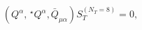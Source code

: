 \begin{equation*}
( Q^\alpha, \,^\star Q^\alpha, \bar{Q}_{\mu \alpha} ) S_T^{(N_T = 8)} = 0,
\end{equation*}

